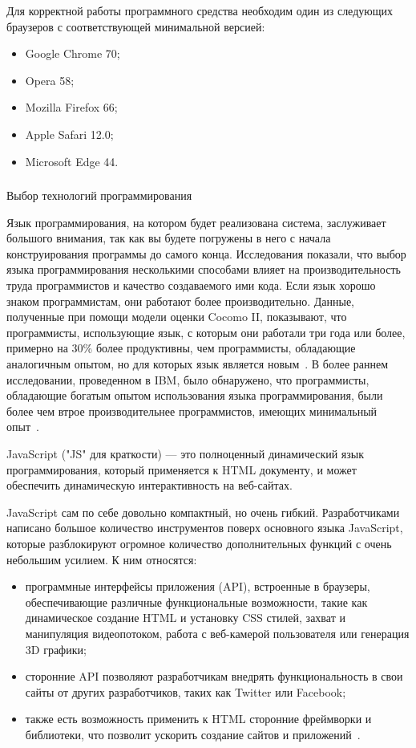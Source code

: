 Для корректной работы программного средства необходим один из следующих браузеров с соответствующей минимальной версией:

\begin{itemize}
	\item Google Chrome 70;
	\item Opera 58;
	\item Mozilla Firefox 66;
	\item Apple Safari 12.0;
	\item Microsoft Edge 44.
\end{itemize}

\subsubsection{} Выбор технологий программирования
\label{sec:analysis:specification:language}

Язык программирования, на котором будет реализована система, заслуживает большого внимания, так как вы будете
погружены в него с начала конструирования программы до самого конца. Исследования показали, что выбор языка
программирования несколькими способами влияет на производительность труда программистов и качество создаваемого ими
кода. Если язык хорошо знаком программистам, они работают более производительно. Данные, полученные при помощи модели
оценки Cocomo II, показывают, что программисты, использующие язык, с которым они работали три года или более, примерно
на 30\% более продуктивны, чем программисты, обладающие аналогичным опытом, но для которых язык является
новым~\cite{software_cost_estimation}. В более раннем исследовании, проведенном в IBM, было обнаружено, что
программисты, обладающие богатым опытом использования языка программирования, были более чем втрое
производительнее программистов, имеющих минимальный опыт~\cite{method_of_programming_measurement_and_estimation}.

JavaScript ("JS" для краткости) — это полноценный динамический язык программирования, который применяется к HTML
документу, и может обеспечить динамическую интерактивность на веб-сайтах.

JavaScript сам по себе довольно компактный, но очень гибкий. Разработчиками написано большое количество инструментов
поверх основного языка JavaScript, которые разблокируют огромное количество дополнительных функций с очень
небольшим усилием. К ним относятся:

\begin{itemize}
	\item программные интерфейсы приложения (API), встроенные в браузеры, обеспечивающие различные функциональные
	возможности, такие как динамическое создание HTML и установку CSS стилей, захват и манипуляция видеопотоком, работа с
	веб-камерой пользователя или генерация 3D графики;
	\item сторонние API позволяют разработчикам внедрять функциональ\-ность в свои сайты от других разработчиков,
	таких как Twitter или Facebook;
	\item также есть возможность применить к HTML сторонние фреймворки и библиотеки, что позволит ускорить создание
	сайтов и приложений~\cite{javascript_basics}.
\end{itemize}

